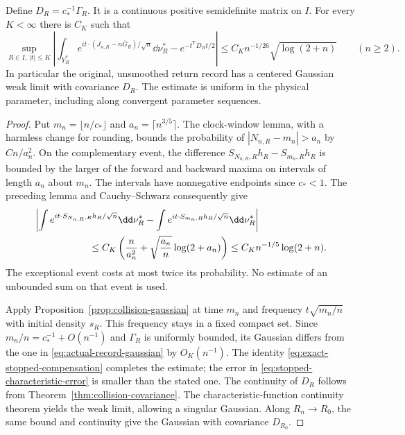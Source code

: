 \begin{theorem}
\label{thm:actual-record-gaussian}
Define $D_R=c_*^{-1}\Gamma_R$. It is a continuous positive semidefinite
matrix on $I$. For every $K<\infty$ there is $C_K$ such that
\begin{equation}\label{eq:actual-record-gaussian}
 \sup_{R\in I,\ |t|\le K}
 \left|\int_{Y_R^*}
 e^{it\cdot(J_{n,R}-n\bar G_R)/\sqrt n}\dd\nu_R^*
          -e^{-t^{\mathsf T}D_Rt/2}\right|
       \le C_K n^{-1/26}\sqrt{\log(2+n)}
       \qquad(n\ge2).
\end{equation}
In particular the original, unsmoothed return record has a centered
Gaussian weak limit with covariance $D_R$. The estimate is uniform in
the physical parameter, including along convergent parameter sequences.
\end{theorem}
\begin{proof}
Put $m_n=\lfloor n/c_*\rfloor$ and
$a_n=\lceil n^{3/5}\rceil$. The clock-window lemma, with a harmless
change for rounding, bounds the probability of
$|N_{n,R}-m_n|>a_n$ by $Cn/a_n^2$. On the complementary event, the
difference $S_{N_{n,R},R}h_R-S_{m_n,R}h_R$ is bounded by the larger
of the forward and backward maxima on intervals of length $a_n$ about
$m_n$. The intervals have nonnegative endpoints since $c_*<1$.
The preceding lemma and Cauchy--Schwarz consequently give
\begin{equation}\label{eq:stopped-characteristic-error}
 \begin{split}
 &\left|\int e^{it\cdot S_{N_{n,R},R}h_R/\sqrt n}\dd\nu_R^*
       -\int e^{it\cdot S_{m_n,R}h_R/\sqrt n}\dd\nu_R^*\right|\\
 &\hspace{20mm}\le C_K\left(\frac{n}{a_n^2}
                  +\sqrt{\frac{a_n}{n}}\log(2+a_n)\right)
       \le C_K n^{-1/5}\log(2+n).
 \end{split}
\end{equation}
The exceptional event costs at most twice its probability. No estimate
of an unbounded sum on that event is used.

Apply Proposition~\ref{prop:collision-gaussian} at time $m_n$ and
frequency $t\sqrt{m_n/n}$ with initial density $s_R$. This frequency
stays in a fixed compact set. Since $m_n/n=c_*^{-1}+O(n^{-1})$ and
$\Gamma_R$ is uniformly bounded, its Gaussian differs from the one in
\eqref{eq:actual-record-gaussian} by $O_K(n^{-1})$. The identity
\eqref{eq:exact-stopped-compensation} completes the estimate; the error
in \eqref{eq:stopped-characteristic-error} is smaller than the stated
one. The continuity of $D_R$ follows from
Theorem~\ref{thm:collision-covariance}. The characteristic-function
continuity theorem yields the weak limit, allowing a singular Gaussian.
Along $R_n\to R_0$, the same bound and continuity give the Gaussian
with covariance $D_{R_0}$.
\end{proof}


